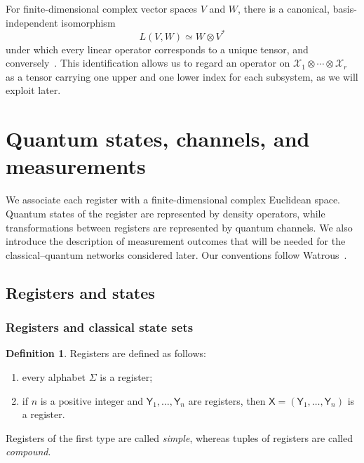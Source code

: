 \documentclass[
    aps,
    pra,
    reprint,
    superscriptaddress,
    nofootinbib
]{revtex4-2}
\theoremstyle{definition}
\newtheorem{definition}{Definition}[section]
\theoremstyle{plain}
\begin{document}
For finite-dimensional complex vector spaces $V$ and $W$, there is a
canonical, basis-independent isomorphism
\cite[Sec.~1]{Conrad2006TensorMaps}
\begin{equation}
    L(V,W)\simeq W\otimes V^{*}
\end{equation}
under which every linear operator corresponds to a unique tensor, and
conversely~\cite[Sec.~1.28]{Greub1978}. This identification allows us to
regard an operator on
$\mathcal{X}_{1}\otimes\cdots\otimes\mathcal{X}_{r}$ as a tensor
carrying one upper and one lower index for each subsystem, as we will
exploit later.


\section{Quantum states, channels, and measurements}
\label{sec:basic-quantum-information}

We associate each register with a finite-dimensional complex Euclidean space.
Quantum states of the register are represented by density operators, while
transformations between registers are represented by quantum channels. We
also introduce the description of measurement outcomes that will be needed
for the classical--quantum networks considered later. Our conventions follow
Watrous~\cite[Secs.~2.1.1--2.1.2]{Watrous2018}.

\subsection{Registers and states}

\subsubsection{Registers and classical state sets}

\begin{definition}
    Registers are defined as follows:
    \begin{enumerate}
        \item every alphabet $\Sigma$ is a register;
        \item if $n$ is a positive integer and
        $\mathsf{Y}_1,\ldots,\mathsf{Y}_n$ are registers, then
        $\mathsf{X}=(\mathsf{Y}_1,\ldots,\mathsf{Y}_n)$ is a register.
    \end{enumerate}
\end{definition}

Registers of the first type are called \emph{simple}, whereas tuples of
registers are called \emph{compound}.
\end{document}
